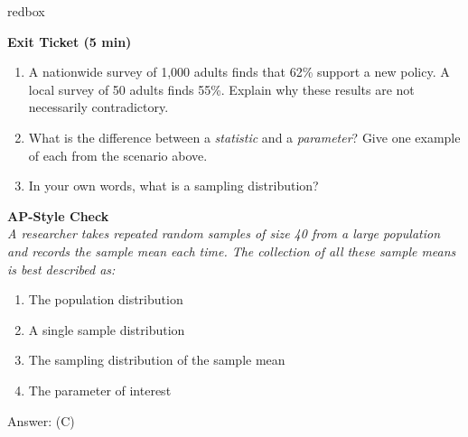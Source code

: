 \documentclass[10pt]{article}
\begin{document}
\begin{skillbox}{redbox}
\begin{minipage}[t]{0.48\linewidth}
    \textbf{Exit Ticket (5 min)}
    \begin{enumerate}
        \item A nationwide survey of 1,000 adults finds that 62\% support a new policy.
              A local survey of 50 adults finds 55\%. Explain why these results are not
              necessarily contradictory.
        \item What is the difference between a \emph{statistic} and a \emph{parameter}?
              Give one example of each from the scenario above.
        \item In your own words, what is a sampling distribution?
    \end{enumerate}
\end{minipage}
\hfill
\begin{minipage}[t]{0.48\linewidth}
    \textbf{AP-Style Check}\\
    \textit{A researcher takes repeated random samples of size 40 from a large population
    and records the sample mean each time. The collection of all these sample means is
    best described as:}
    \begin{enumerate}[label=(\Alph*)]
        \item The population distribution
        \item A single sample distribution
        \item The sampling distribution of the sample mean
        \item The parameter of interest
    \end{enumerate}
    Answer: (C)
\end{minipage}
\end{skillbox}
\end{document}
